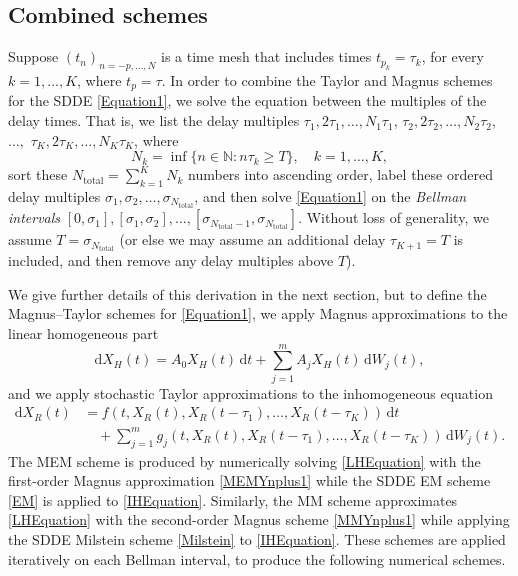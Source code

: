 \documentclass[onefignum]{siamart250211}
\begin{document}
\subsection{Combined schemes}\label{Section2.2}

Suppose $(t_n)_{n=-p,\ldots,N}$ is a time mesh that includes times $t_{p_k}=\tau_k$, for every $k=1,\ldots,K$, where $t_{p}=\tau$. In order to combine the Taylor and Magnus schemes for the SDDE \cref{Equation1}, we solve the equation between the multiples of the delay times. That is, we list the delay multiples $\tau_1,2\tau_1,\ldots,N_1\tau_1$, $\tau_2,2\tau_2,\ldots,N_2\tau_2$, $\ldots,$ $\tau_K,2\tau_K,\ldots,N_K\tau_K$, where
\[N_k=\inf\{n\in\mathbb{N}:n\tau_k\geqslant T\},\quad k=1,\ldots,K,\]
sort these $N_{\mathrm{total}}=\sum_{k=1}^KN_k$ numbers into ascending order, label these ordered delay multiples $\sigma_1,\allowbreak\sigma_2,\allowbreak\ldots,\allowbreak\sigma_{N_{\mathrm{total}}}$, and then solve \cref{Equation1} on the \emph{Bellman intervals} $[0,\sigma_1],\allowbreak[\sigma_1,\sigma_2],\allowbreak\ldots,\allowbreak[\sigma_{{N_{\mathrm{total}}}-1},\sigma_{N_{\mathrm{total}}}]$. Without loss of generality, we assume $T=\sigma_{N_{\mathrm{total}}}$ (or else we may assume an additional delay $\tau_{K+1}=T$ is included, and then remove any delay multiples above $T$).

We give further details of this derivation in the next section, but to define the Magnus--Taylor schemes for \cref{Equation1}, we apply Magnus approximations to the linear homogeneous part
\begin{equation}\mathrm{d}X_H(t)=A_0X_H(t)\,\mathrm{d}t+\sum_{j=1}^mA_jX_H(t)\,\mathrm{d}W_j(t),\label{LHEquation}\end{equation}
and we apply stochastic Taylor approximations to the inhomogeneous equation
\begin{align}\mathrm{d}X_R(t)&=f(t,X_R(t),X_R(t-\tau_1),\ldots,X_R(t-\tau_K))\,\mathrm{d}t\label{IHEquation}\\
&\quad+\sum_{j=1}^mg_j(t,X_R(t),X_R(t-\tau_1),\ldots,X_R(t-\tau_K))\,\mathrm{d}W_j(t).\nonumber\end{align}
The MEM scheme is produced by numerically solving \cref{LHEquation} with the first-order Magnus approximation \cref{MEMYnplus1} while the SDDE EM scheme \cref{EM} is applied to \cref{IHEquation}. Similarly, the MM scheme approximates \cref{LHEquation} with the second-order Magnus scheme \cref{MMYnplus1} while applying the SDDE Milstein scheme \cref{Milstein} to \cref{IHEquation}. These schemes are applied iteratively on each Bellman interval, to produce the following numerical schemes.
\end{document}
